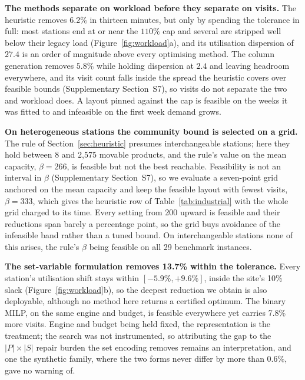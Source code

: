 \documentclass[]{interact}
\begin{document}
\textbf{The methods separate on workload before they separate on visits.} The heuristic removes 6.2\% in thirteen minutes, but only by spending the tolerance in full: most stations end at or near the $110\%$ cap and several are stripped well below their legacy load (Figure~\ref{fig:workload}a), and its utilisation dispersion of $27.4$ is an order of magnitude above every optimising method. The column generation removes $5.8\%$ while holding dispersion at $2.4$ and leaving headroom everywhere, and its visit count falls inside the spread the heuristic covers over feasible bounds (Supplementary Section~S7), so visits do not separate the two and workload does. A layout pinned against the cap is feasible on the weeks it was fitted to and infeasible on the first week demand grows.

\textbf{On heterogeneous stations the community bound is selected on a grid.} The rule of Section~\ref{sec:heuristic} presumes interchangeable stations; here they hold between 8 and 2{,}575 movable products, and the rule's value on the mean capacity, $\beta=266$, is feasible but not the best reachable. Feasibility is not an interval in $\beta$ (Supplementary Section~S7), so we evaluate a seven-point grid anchored on the mean capacity and keep the feasible layout with fewest visits, $\beta=333$, which gives the heuristic row of Table~\ref{tab:industrial} with the whole grid charged to its time. Every setting from 200 upward is feasible and their reductions span barely a percentage point, so the grid buys avoidance of the infeasible band rather than a tuned bound. On interchangeable stations none of this arises, the rule's $\beta$ being feasible on all 29 benchmark instances.

\textbf{The set-variable formulation removes 13.7\% within the tolerance.} Every station's utilisation shift stays within $[-5.9\%, +9.6\%]$, inside the site's 10\% slack (Figure~\ref{fig:workload}b), so the deepest reduction we obtain is also deployable, although no method here returns a certified optimum. The binary MILP, on the same engine and budget, is feasible everywhere yet carries 7.8\% more visits. Engine and budget being held fixed, the representation is the treatment; the search was not instrumented, so attributing the gap to the $|P| \times |S|$ repair burden the set encoding removes remains an interpretation, and one the synthetic family, where the two forms never differ by more than 0.6\%, gave no warning of.
\end{document}
